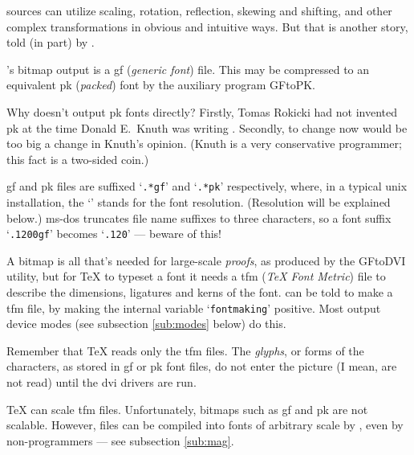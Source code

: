 \MF{} sources can utilize scaling, rotation, reflection, skewing and shifting,
and other complex transformations in obvious and intuitive ways.
But that is another story, told (in part) by \MFbook{}.

\MF{}'s bitmap output is a {\sc gf} ({\em generic font\/}) file.
This may be compressed to an equivalent {\sc pk} ({\em packed\/}) font
by the auxiliary program {\sf GFtoPK}.

Why doesn't \MF{} output {\sc pk} fonts directly?  Firstly, Tomas
{\sc Rokicki} had not invented {\sc pk} at the time Donald
E.~{\sc Knuth} was writing \MF{}.  Secondly, to change \MF{} now
would be too big a change in {\sc Knuth}'s opinion.  ({\sc Knuth}
is a very conservative programmer; this fact is a two-sided coin.)

{\sc gf} and {\sc pk} files are suffixed `{\tt .*gf}' and `{\tt .*pk}'
respectively, where, in a typical {\sc unix} installation, the
`{\tt *}' stands for the font resolution.
(Resolution will be explained below.)
{\sc ms-dos} truncates file name suffixes to three characters, so a
font suffix `{\tt .1200gf}' becomes `{\tt .120}' --- beware of this!

A bitmap is all that's needed for large-scale {\em proofs},
as produced by the {\sf GFtoDVI} utility,
but for \TeX{} to typeset a font it needs a {\sc tfm}
({\em \TeX{} Font Metric\/}) file to describe the dimensions, ligatures
and kerns of the font.  \MF{} can be told to make a {\sc tfm} file,
by making the internal variable `{\tt fontmaking}' positive.  Most
output device modes (see subsection \ref{sub:modes} below) do this.

Remember that \TeX{} reads only the {\sc tfm} files.
The {\em glyphs}, or forms of the characters, as stored in {\sc gf}
or {\sc pk} font files, do not enter the picture
(I mean, are not read)
until the {\sc dvi} drivers are run.

\TeX{} can scale {\sc tfm} files.  Unfortunately, bitmaps such as
{\sc gf} and {\sc pk} are not scalable.
However, \MF{} files can be compiled into fonts of arbitrary scale
by \MF{}, even
by non-programmers --- see subsection \ref{sub:mag}.

